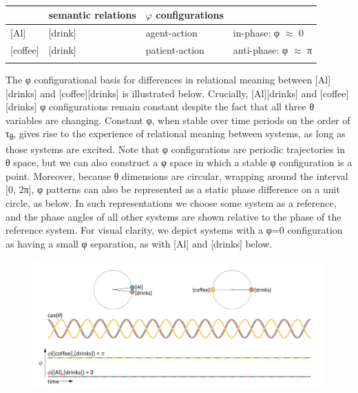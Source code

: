   \begin{table}
\begin{tabularx}{\textwidth}{XXll}
  \lsptoprule
  \multicolumn{2}{c}{\textbf{conceptual systems}} & 
  \textbf{semantic relations} & 
  \textbf{$\varphi$ configurations}\\
  \midrule{}
  [Al] & [drink] & agent-action & in-phase: φ ${\approx}$ 0\\{}
  [coffee] & [drink] & patient-action & anti-phase: φ ${\approx}$ π\\
  \lspbottomrule
  \end{tabularx}
\caption{\missingcaption}
\label{tab:1:1}
\end{table}

  The φ configurational basis for differences in relational meaning between [Al][drinks] and [coffee][drinks] is illustrated below. Crucially, [Al][drinks] and [coffee][drinks] φ configurations remain constant despite the fact that all three θ variables are changing. Constant φ, when stable over time periods on the order of τ\textsubscript{θ}, gives rise to the experience of relational meaning between systems, as long as those systems are excited. Note that φ configurations are periodic trajectories in θ space, but we can also construct a φ space in which a stable φ configuration is a point. Moreover, because θ dimensions are circular, wrapping around the interval [0, 2π], φ patterns can also be represented as a static phase difference on a unit circle, as below. In such representations we choose some system as a reference, and the phase angles of all other systems are shown relative to the phase of the reference system. For visual clarity, we depict systems with a φ=0 configuration as having a small φ separation, as with [Al] and [drinks] below.

  
\begin{figure}
\includegraphics[width=\textwidth]{figures/Tilsen-img15.png}
\caption{\missingcaption}
\label{fig:2:8}
\end{figure}
 

